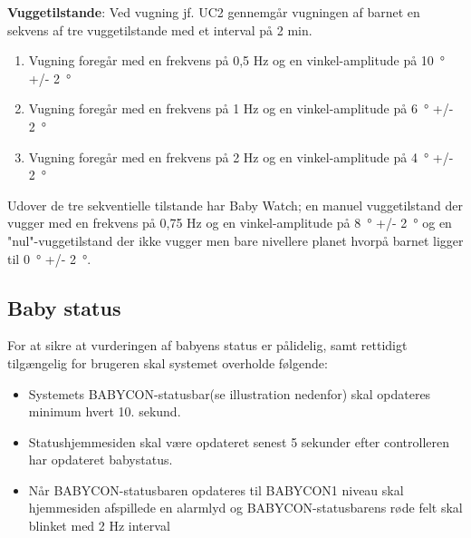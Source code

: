 \textbf{Vuggetilstande}: \label{kravspec:ikke_funk_vuggetilstande}
Ved vugning jf. UC2 gennemgår vugningen af barnet en sekvens af tre vuggetilstande med et interval på 2 min.
\begin{enumerate}

\item Vugning foregår med en frekvens på 0,5 Hz og en vinkel-amplitude på \SI{10}{\degree} +/- \SI{2}{\degree}
\item Vugning foregår med en frekvens på 1 Hz og en vinkel-amplitude på \SI{6}{\degree} +/- \SI{2}{\degree}
\item Vugning foregår med en frekvens på 2 Hz og en vinkel-amplitude på \SI{4}{\degree} +/- \SI{2}{\degree}
\end{enumerate}

Udover de tre sekventielle tilstande har Baby Watch; en manuel vuggetilstand der vugger med en frekvens på 0,75 Hz og en vinkel-amplitude på \SI{8}{\degree} +/- \SI{2}{\degree} og en "nul"-vuggetilstand der ikke vugger men bare nivellere planet hvorpå barnet ligger til \SI{0}{\degree} +/- \SI{2}{\degree}.

\subsection*{Baby status}
For at sikre at vurderingen af babyens status er pålidelig, samt rettidigt tilgængelig for brugeren skal systemet overholde følgende:
\begin{itemize}
\item Systemets BABYCON-statusbar(se illustration nedenfor) skal opdateres minimum hvert 10. sekund.
\item Statushjemmesiden skal være opdateret senest 5 sekunder efter controlleren har opdateret babystatus.
\item Når BABYCON-statusbaren opdateres til BABYCON1 niveau skal hjemmesiden afspillede en alarmlyd og BABYCON-statusbarens røde felt skal blinket med 2 Hz interval
\end{itemize}

